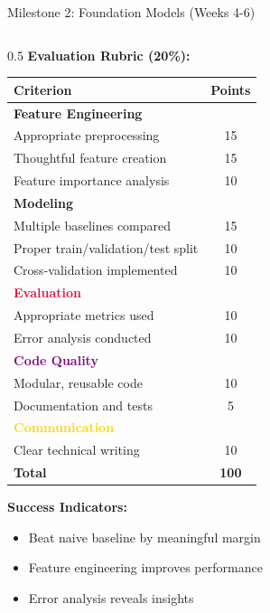 \begin{frame}{Milestone 2: Foundation Models (Weeks 4-6)}
\begin{columns}
\begin{column}{0.5\textwidth}
\textbf{Evaluation Rubric (20\%):}

\begin{table}
\tiny
\begin{tabular}{|l|c|}
\hline
\rowcolor{navyblue!20}
\textbf{Criterion} & \textbf{Points} \\
\hline
\textcolor{forest}{\textbf{Feature Engineering}} & \\
\hline
Appropriate preprocessing & 15 \\
Thoughtful feature creation & 15 \\
Feature importance analysis & 10 \\
\hline
\textcolor{navyblue}{\textbf{Modeling}} & \\
\hline
Multiple baselines compared & 15 \\
Proper train/validation/test split & 10 \\
Cross-validation implemented & 10 \\
\hline
\textcolor{crimson}{\textbf{Evaluation}} & \\
\hline
Appropriate metrics used & 10 \\
Error analysis conducted & 10 \\
\hline
\textcolor{purple}{\textbf{Code Quality}} & \\
\hline
Modular, reusable code & 10 \\
Documentation and tests & 5 \\
\hline
\textcolor{gold}{\textbf{Communication}} & \\
\hline
Clear technical writing & 10 \\
\hline
\textbf{Total} & \textbf{100} \\
\hline
\end{tabular}
\end{table}

\vspace{0.2cm}

\textbf{Success Indicators:}
\begin{itemize}
\item[$\checkmark$] Beat naive baseline by meaningful margin
\item[$\checkmark$] Feature engineering improves performance
\item[$\checkmark$] Error analysis reveals insights
\end{itemize}
\end{column}
\end{columns}
\end{frame}


